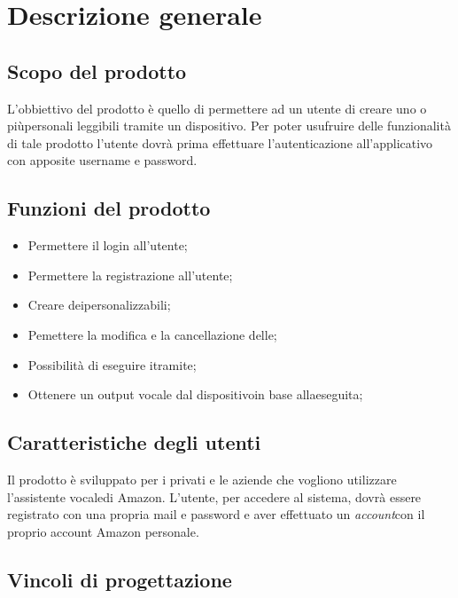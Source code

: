 \chapter{Descrizione generale}

\section{Scopo del prodotto}
L'obbiettivo del prodotto è quello di permettere ad un utente di creare uno o piùpersonali leggibili tramite un dispositivo.
Per poter usufruire delle funzionalità di tale prodotto l'utente dovrà prima effettuare l'autenticazione all'applicativo con apposite username e password.

\section{Funzioni del prodotto}
\begin{itemize}
	\item Permettere il login all'utente;
	\item Permettere la registrazione all'utente;
	\item Creare deipersonalizzabili;
	\item Pemettere la modifica e la cancellazione delle;
	\item Possibilità di eseguire itramite;
	\item Ottenere un output vocale dal dispositivoin base allaeseguita;
\end{itemize}

\section{Caratteristiche degli utenti}
Il prodotto è sviluppato per i privati e le aziende che vogliono utilizzare l'assistente vocaledi Amazon.
L'utente, per accedere al sistema, dovrà essere registrato con una propria mail e password e aver effettuato un \textit{account}con il proprio account Amazon personale.


\section{Vincoli di progettazione}

